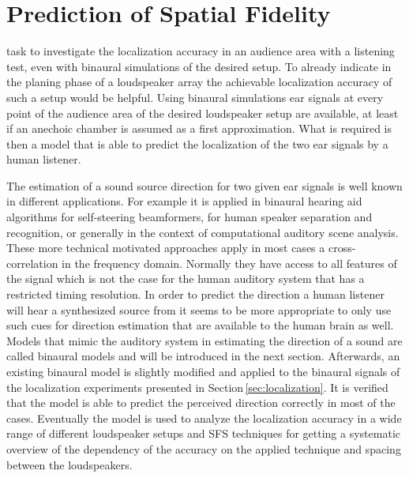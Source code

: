 \def \GITHUB {\GITHUBBASE/06_modeling}


\chapter{Prediction of Spatial Fidelity}
\label{cha:modelling}
%
 task to investigate the localization accuracy
in an audience area with a listening test, even with binaural simulations of the
desired setup. To already indicate in the planing phase of a loudspeaker array
the achievable localization accuracy of such a setup would be helpful.
Using binaural simulations ear signals at every point of the
audience area of the desired loudspeaker setup are available, at least if an
anechoic chamber is assumed as a first approximation. What is required is then
a model that is able to predict the localization of the two ear signals by a human
listener.

The estimation of a sound source direction for two given ear signals
is well known in different applications. For example it is applied in
binaural hearing aid algorithms for self-steering
beamformers\autocite{Rohdenburg2008}, for human speaker separation and
recognition,\autocite{May2012} or generally in the context of
computational auditory scene analysis.\autocite{Wang2006}
These more technical motivated approaches apply in most cases a
cross-correlation in the frequency domain.\autocite[E.g.][]{Knapp1976}
Normally they have access to all features of the signal which is not the case
for the human auditory system that has a restricted timing resolution.
In order to predict the direction a human listener will hear a synthesized
source from it seems to be more appropriate to only use
such cues for direction estimation that are available to the human brain as well.
Models that mimic the auditory system in estimating the direction of a sound
are called binaural models and will be introduced in the next section.
Afterwards,
an existing binaural model is slightly modified and applied to the binaural
signals of the localization experiments presented in Section\,\ref{sec:localization}.
It is verified that the model is able to predict the perceived direction
correctly in most of the cases.
Eventually the model is used to analyze the localization accuracy in a wide range of
different loudspeaker setups and \ac{SFS} techniques for getting a systematic
overview of the dependency of the accuracy on the applied technique and spacing
between the loudspeakers.


